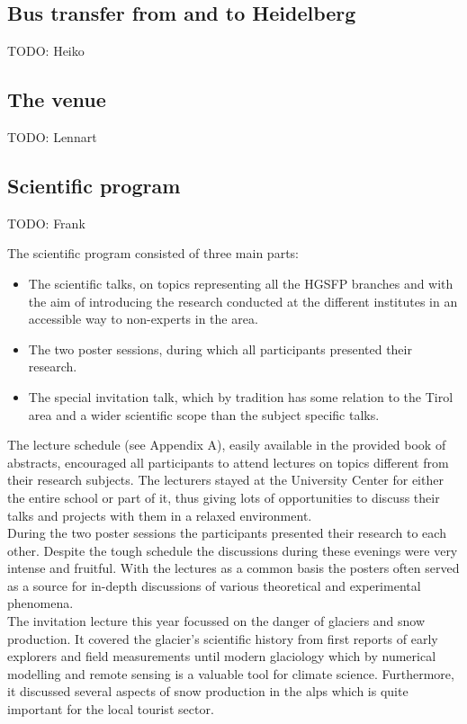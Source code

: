 \documentclass[11pt,a4paper]{article}
\numberwithin{equation}{section}
\numberwithin{table}{section}\setlength{\multlinegap}{25pt}
\begin{document}
\subsection*{Bus transfer from and to Heidelberg}
TODO: Heiko

\subsection*{The venue}

TODO: Lennart

\subsection*{Scientific program}

TODO: Frank

\noindent The scientific program consisted of three main parts: 
\begin{itemize}
\item The scientific talks, on topics representing all the HGSFP branches and with the aim of introducing the research conducted at the different institutes in an accessible way to non-experts in the area. 
\item The two poster sessions, during which all participants presented their research.
\item The special invitation talk, which by tradition has some relation to the Tirol area and a wider scientific scope than the subject specific talks. 
\end{itemize}

The lecture schedule (see Appendix A), easily available in the provided book of abstracts, encouraged all participants to attend lectures on topics different from their research subjects. The lecturers stayed at the University Center for either the entire school or part of it, thus giving lots of opportunities to discuss their talks and projects with them in a relaxed environment. \\
During the two poster sessions the participants presented their research to each other. Despite the tough schedule the discussions during these evenings were very intense and fruitful. With the lectures as a common basis the posters often served as a source for in-depth discussions of various theoretical and experimental phenomena. \\
The invitation lecture this year focussed on the danger of glaciers and snow production. It covered the glacier's scientific history from first reports of early explorers and field measurements until modern glaciology which by numerical modelling and remote sensing is a valuable tool for climate science. Furthermore, it discussed several aspects of snow production in the alps which is quite important for the local tourist sector.
\end{document}
